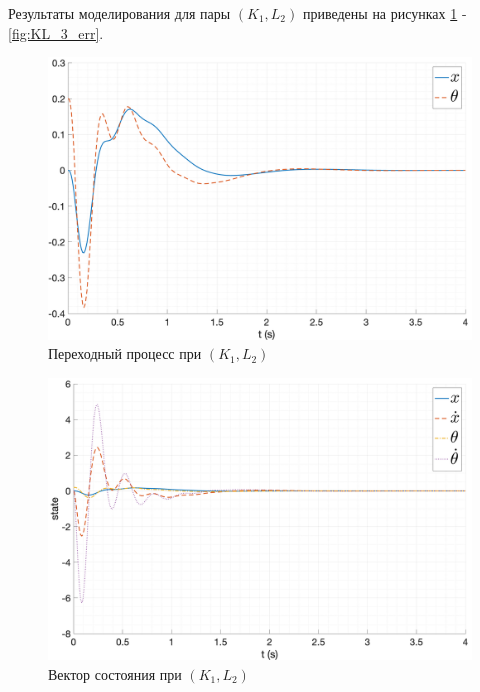 Результаты моделирования для пары $(K_1, L_2)$ приведены на рисунках \ref{fig:KL_3_out} - \ref{fig:KL_3_err}.
\begin{figure}[ht!]
    \centering
    \includegraphics[width=\textwidth]{media/plots/nonmodal_observer_controller/kl_3.png}
    \caption{Переходный процесс при $(K_1, L_2)$}
    \label{fig:KL_3_out}
\end{figure}
\begin{figure}[ht!]
    \centering
    \includegraphics[width=\textwidth]{media/plots/nonmodal_observer_controller/state_3.png}
    \caption{Вектор состояния при $(K_1, L_2)$}
    \label{fig:KL_3_state}
\end{figure}
